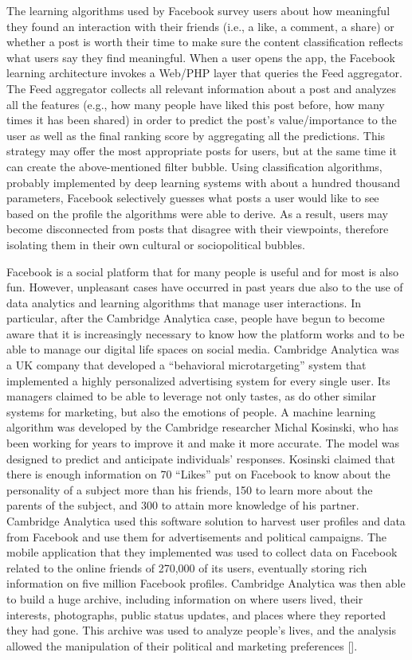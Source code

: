 The learning algorithms used by Facebook survey users about how meaningful they found an interaction with their friends (i.e., a like, a comment, a share) or whether a post is worth their time to make sure the content classification reflects what users say they find meaningful. When a user opens the app, the Facebook learning architecture invokes a Web/PHP layer that queries the Feed aggregator. The Feed aggregator collects all relevant information about a post and analyzes all the features (e.g., how many people have liked this post before, how many times it has been shared) in order to predict the post's value/importance to the user as well as the final ranking score by aggregating all the predictions. This strategy may offer the most appropriate posts for users, but at the same time it can create the above-mentioned filter bubble. Using classification algorithms, probably implemented by deep learning systems with about a hundred thousand parameters, Facebook selectively guesses what posts a user would like to see based on the profile the algorithms were able to derive. As a result, users may become disconnected from posts that disagree with their viewpoints, therefore isolating them in their own cultural or sociopolitical bubbles.

Facebook is a social platform that for many people is useful and for most is also fun. However, unpleasant cases have occurred in past years due also to the use of data analytics and learning algorithms that manage user interactions. In particular, after the Cambridge Analytica case, people have begun to become aware that it is increasingly necessary to know how the platform works and to be able to manage our digital life spaces on social media. Cambridge Analytica was a UK company that developed a ``behavioral microtargeting'' system that implemented a highly personalized advertising system for every single user. Its managers claimed to be able to leverage not only tastes, as do other similar systems for marketing, but also the emotions of people. A machine learning algorithm was developed by the Cambridge researcher Michal Kosinski, who has been working for years to improve it and make it more accurate. The model was designed to predict and anticipate individuals' responses. Kosinski claimed that there is enough information on 70 ``Likes'' put on Facebook to know about the personality of a subject more than his friends, 150 to learn more about the parents of the subject, and 300 to attain more knowledge of his partner. Cambridge Analytica used this software solution to harvest user profiles and data from Facebook and use them for advertisements and political campaigns. The mobile application that they implemented was used to collect data on Facebook related to the online friends of 270,000 of its users, eventually storing rich information on five million Facebook profiles. Cambridge Analytica was then able to build a huge archive, including information on where users lived, their interests, photographs, public status updates, and places where they reported they had gone. This archive was used to analyze people's lives, and the analysis allowed the manipulation of their political and marketing preferences [\citealt{chap:05:Talia:2019}].

